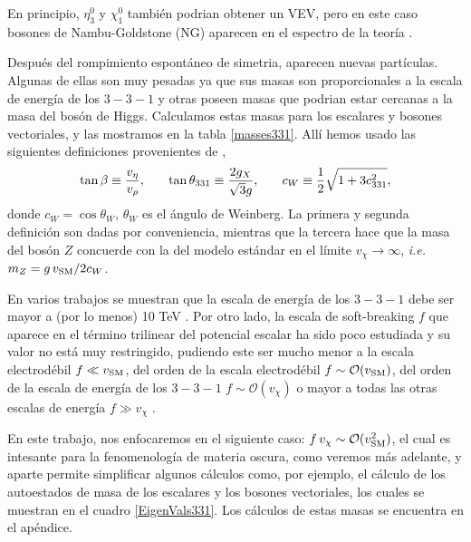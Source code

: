 En principio, $\eta_3^0$ y $\chi_1^0$ también podrian obtener un VEV, pero en este caso bosones de Nambu-Goldstone (NG) aparecen en el espectro de la teoría \cite{sanchez2018new}. 


Después del rompimiento espontáneo de simetria, aparecen nuevas partículas. Algunas de ellas son muy pesadas ya que sus masas son proporcionales a la escala de energía de los $3-3-1$ y otras poseen masas que podrian estar cercanas a la masa del bosón de Higgs. Calculamos estas masas para los escalares y bosones vectoriales, y las mostramos en la tabla \ref{masses331}. Allí hemos usado las siguientes definiciones provenientes de \cite{Okada:2016whh},
\begin{equation}
\tan \beta \equiv \frac{v_{\eta}}{v_\rho}, \hspace{0.25in} \tan \theta_{331} \equiv \frac{2g_X}{\sqrt{3}g}, \hspace{0.25in} c_W \equiv \frac{1}{2} \sqrt{1+3c_{331}^2},
\end{equation}
donde $c_W = \cos \theta_W$, $\theta_W$ es el ángulo de Weinberg. La primera y segunda definición son dadas por conveniencia, mientras que la tercera hace que la masa del bosón $Z$ concuerde con la del modelo estándar en el límite $v_\chi \to \infty$, \textit{i.e.} $m_Z = g\, v_{\rm SM}/2c_W$.


En varios trabajos se muestran que la escala de energía de los $3-3-1$ debe ser mayor a (por lo menos) 10 TeV \cite{Salazar:2015gxa,Queiroz:2016gif,Alvarez-Salazar:2019cxw}. Por otro lado, la escala de soft-breaking $f$ que aparece en el término trilinear del potencial escalar ha sido poco estudiada y su valor no está muy restringido, pudiendo este ser mucho menor a la escala electrodébil $f \ll v_{\rm SM}$, del orden de la escala electrodébil $f \sim \mathcal{O} (v_{\rm SM})$, del orden de la escala de energía de los $3-3-1$ $f \sim \mathcal{O} (v_{\chi})$ o mayor a todas las otras escalas de energía $f \gg v_\chi$ \cite{Pinheiro:2022bcs}.

En este trabajo, nos enfocaremos en el siguiente caso: $f \,v_\chi \sim \mathcal{O}(v_{\rm SM}^2)$, el cual es intesante para la fenomenología de materia oscura, como veremos más adelante, y aparte permite simplificar algunos cálculos como, por ejemplo, el cálculo de los autoestados de masa de los escalares y los bosones vectoriales, los cuales se muestran en el cuadro \ref{EigenVals331}. Los cálculos de estas masas se encuentra en el apéndice.

